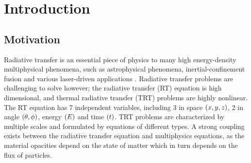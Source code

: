 \chapter{Introduction}
\label{chap-one}
\setlength\parindent{0pt}  

\newcommand{\grpint}[1]{\int_{\nu_{g}}^{\nu_{g+1}} \ #1 \ d\nu}
\newcommand{\angint}[1]{\int_{4\pi} \ #1 \ d\Omega}
\newcommand{\angintt}[1]{\int_{4\pi} \ #1 \ \bOm d\Omega}
\newcommand{\grpsum}[1]{\sum_{g=1}^{N_g} \ #1 }
\newcommand{\grpintb}[1]{\int_{\nu_{g}}^{\nu_{g+1}}\brk{#1}d\nu}
\newcommand{\angintb}[1]{\int_{4\pi}\brk{#1}d\Omega}
\newcommand{\anginttb}[1]{\int_{4\pi}\brk{#1}\bOm d\Omega}
\newcommand{\grpsumb}[1]{\sum_{g=1}^{N_g}\brk{#1}}
\newcommand{\xint}[1]{\int_{x_{i-\frac{1}{2}}}^{x_{i+\frac{1}{2}}}\brk{#1}dx}
\newcommand{\xintl}[1]{\int_{x_{i-\frac{1}{2}}}^{x_{i}}\brk{#1}dx}
\newcommand{\xintr}[1]{\int_{x_{i}}^{x_{i+\frac{1}{2}}}\brk{#1}dx}

\newcommand{\modkapgn}{\kapgn^\tau}
\newcommand{\modkapgin}{\kapgin^\tau}
\newcommand{\modkapebin}{\kapebin^\tau}
\newcommand{\modkaprbirn}{\kaprbirn^\tau}
\newcommand{\modkapgirn}{\kapgirn^\tau}
\newcommand{\modkapgirrn}{\kapgirrn^\tau}

\section{Motivation} \label{motivation}
	Radiative transfer is an essential piece of physics to many high energy-density multiphysical phenomena, such as astrophysical phenomena, inertial-confinement fusion and various laser-driven applications \cite{drake-hedp}. Radiative transfer problems are challenging to solve however; the radiative transfer (RT) equation is high dimensional, and thermal radiative transfer (TRT) problems are highly nonlinear. The RT equation has 7 independent variables, including 3 in space $\left( x,y,z\right)$, 2 in angle $\left(\theta,\phi\right)$, energy $\left( E\right)$ and time $\left( t\right)$. TRT problems are characterized by multiple scales and formulated by equations of different types. A strong coupling exists between the radiative transfer equation and multiphysics equations, as the material opacities depend on the state of matter which in turn depends on the flux of particles. 
	
